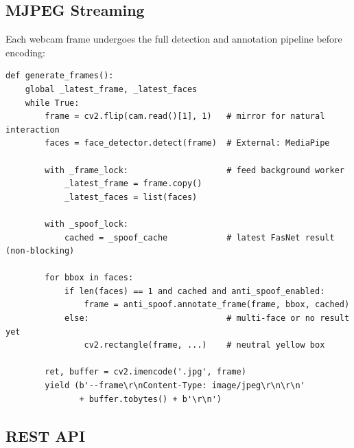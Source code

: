 \documentclass[11pt,a4paper]{article}
\begin{document}
\subsection{MJPEG Streaming}

Each webcam frame undergoes the full detection and annotation pipeline before
encoding:

\begin{lstlisting}[caption={MJPEG frame generator (\texttt{app.py}).  Anti-spoof result is read from the background-thread cache, not computed inline.}]
def generate_frames():
    global _latest_frame, _latest_faces
    while True:
        frame = cv2.flip(cam.read()[1], 1)   # mirror for natural interaction
        faces = face_detector.detect(frame)  # External: MediaPipe

        with _frame_lock:                    # feed background worker
            _latest_frame = frame.copy()
            _latest_faces = list(faces)

        with _spoof_lock:
            cached = _spoof_cache            # latest FasNet result (non-blocking)

        for bbox in faces:
            if len(faces) == 1 and cached and anti_spoof_enabled:
                frame = anti_spoof.annotate_frame(frame, bbox, cached)
            else:                            # multi-face or no result yet
                cv2.rectangle(frame, ...)    # neutral yellow box

        ret, buffer = cv2.imencode('.jpg', frame)
        yield (b'--frame\r\nContent-Type: image/jpeg\r\n\r\n'
               + buffer.tobytes() + b'\r\n')
\end{lstlisting}

\subsection{REST API}
\end{document}

